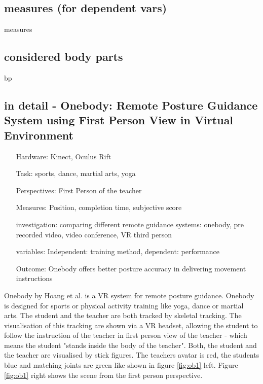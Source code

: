 \subsection{measures (for dependent vars)}
measures
\subsection{considered body parts}
bp
\subsection{in detail - Onebody: Remote Posture Guidance System using First Person View in Virtual Environment}
\begin{itemize}
	\item[Hardware:] Kinect, Oculus Rift
	\item[Task:] sports, dance, martial arts, yoga
	\item[Perspectives:] First Person of the teacher
	\item[Measures:] Position, completion time, subjective score
	\item[investigation:] comparing different remote guidance systems: onebody, pre recorded video, video conference, VR third person
	\item[variables:] Independent: training method, dependent: performance
	\item[Outcome:] Onebody offers better posture accuracy in delivering movement instructions
\end{itemize}
Onebody by Hoang et al. \cite{Reinoso2016} is a VR system for remote posture guidance. Onebody is designed for sports or physical activity training like yoga, dance or martial arts. The student and the teacher are both tracked by skeletal tracking. The visualisation of this tracking are shown via a VR headset, allowing the student to follow the instruction of the teacher in first person view of the teacher - which means the student "stands inside the body of the teacher". Both, the student and the teacher are visualised by stick figures. The teachers avatar is red, the students blue and matching joints are green like shown in figure \ref{fig:ob1} left. Figure \ref{fig:ob1} right shows the scene from the first person perspective.
